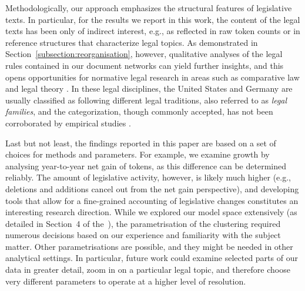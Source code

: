 Methodologically, 
our approach emphasizes the structural features of legislative texts.
In particular, for the results we report in this work, 
the content of the legal texts has been only of indirect interest, 
e.g., as reflected in raw token counts or in reference structures that characterize legal topics.
As demonstrated in Section~\ref{subsection:reorganisation}, however,
qualitative analyses of the legal rules contained in our document networks can yield further insights, 
and this opens opportunities for normative legal research in areas such as comparative law and legal theory \cite{armour2009,spamann2009,cabrelli2015}.
In these legal disciplines, 
the United States and Germany are usually classified as following different legal traditions, also referred to as \emph{legal families},
and the categorization, though commonly accepted, has not been corroborated by empirical studies \cite{zweigertkoetz1998,husa2016,siems2016,glenn2019}.

Last but not least, the findings reported in this paper are based on a set of choices for methods and parameters.
For example, we examine growth by analysing year-to-year net gain of tokens, 
as this difference can be determined reliably.
The amount of legislative activity, however, is likely much higher (e.g., deletions and additions cancel out from the net gain perspective), 
and developing tools that allow for a fine-grained accounting of legislative changes constitutes an interesting research direction.
While we explored our model space extensively (as detailed in Section~4 of the~\suppi),
the parametrisation of the clustering required numerous decisions based on our experience and familiarity with the subject matter.
Other parametrisations are possible, 
and they might be needed in other analytical settings.
In particular, future work could examine selected parts of our data in greater detail, 
zoom in on a particular legal topic, 
and therefore choose very different parameters to operate at a higher level of resolution.
